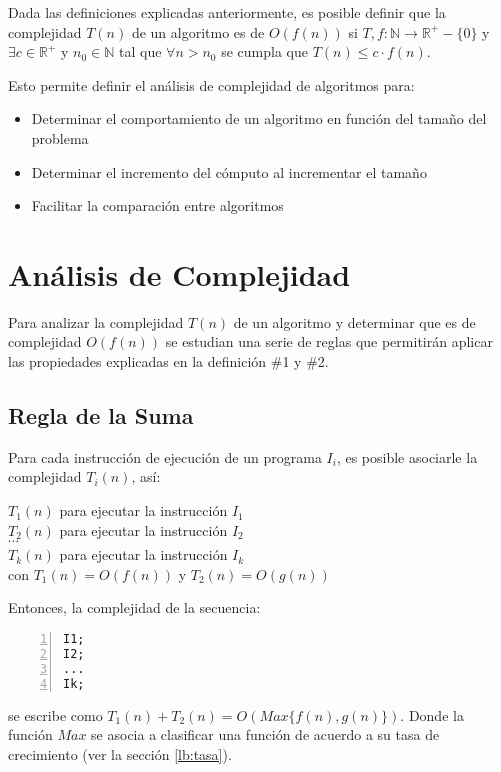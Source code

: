 Dada las definiciones explicadas anteriormente, es posible definir que la complejidad $T(n)$ de un algoritmo es de $O(f(n))$ si $T,f:\mathbb{N} \to \mathbb{R}^+-\{0\}$ y $\exists c \in \mathbb{R}^+$ y $n_0 \in \mathbb{N}$ tal que $\forall n > n_0$ se cumpla que $T(n) \le c \cdot f(n)$.

Esto permite definir el análisis de complejidad de algoritmos para:
\begin{itemize}
\item Determinar el comportamiento de un algoritmo en función del tamaño del problema
\item Determinar el incremento del cómputo al incrementar el tamaño
\item Facilitar la comparación entre algoritmos
\end{itemize}

\section{Análisis de Complejidad} \label{lb:anacompl}

Para analizar la complejidad $T(n)$ de un algoritmo y determinar que es de complejidad $O(f(n))$ se estudian una serie de reglas que permitirán aplicar las propiedades explicadas en la definición \#1 y \#2.

\subsection{Regla de la Suma}

Para cada instrucción de ejecución de un programa $I_i$, es posible asociarle la complejidad $T_i(n)$, así:

$T_1(n)$ para ejecutar la instrucción $I_1$\\
$T_2(n)$ para ejecutar la instrucción $I_2$\\
$\cdots$ \\
$T_k(n)$ para ejecutar la instrucción $I_k$\\

\noindent con $T_1(n) = O(f(n))$ y $T_2(n) = O(g(n))$

Entonces, la complejidad de la secuencia:
\begin{lstlisting}[upquote=true, language=pseudo, numbers=left]
I1;
I2;
...
Ik;
\end{lstlisting}

\noindent se escribe como $T_1(n) + T_2(n) = O(Max\{f(n), g(n)\})$. Donde la función $Max$ se asocia a clasificar una función de acuerdo a su tasa de crecimiento (ver la sección \ref{lb:tasa}).

